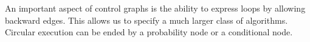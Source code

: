 \documentclass[letterpaper]{article}
\newcommand\rNote[1]{\todo[inline, author=Ronen, color=yellow]{#1}}
\newcommand\aNote[1]{\todo[inline, author=Alex, color=GreenYellow]{#1}}
\newcommand{\frameImage}[4]{
\begin{figure}[H] 
  \centerline{
    \fcolorbox{frameColor}{white}{
        \texttt{[image: \#1]} } }
    \caption{#4}
    \label{fig:#1}
\end{figure}
}
\begin{document}
An important aspect of control graphs is the ability to express loops by allowing backward edges. This allows us to specify a much larger class of algorithms. Circular execution can be ended by a probability node or a conditional node. 








\end{document}

